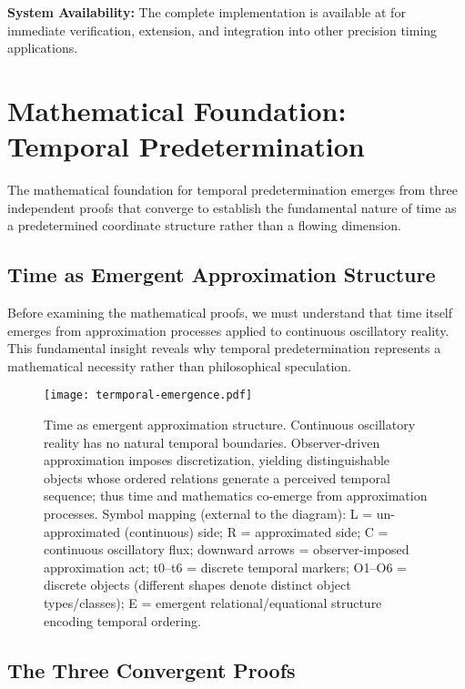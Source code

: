 \documentclass[12pt,a4paper]{article}
\begin{document}
\textbf{System Availability:} The complete implementation is available at \cite{stella-lorraine-implementation} for immediate verification, extension, and integration into other precision timing applications.

\section{Mathematical Foundation: Temporal Predetermination}

The mathematical foundation for temporal predetermination emerges from three independent proofs that converge to establish the fundamental nature of time as a predetermined coordinate structure rather than a flowing dimension.

\subsection{Time as Emergent Approximation Structure}

Before examining the mathematical proofs, we must understand that time itself emerges from approximation processes applied to continuous oscillatory reality. This fundamental insight reveals why temporal predetermination represents a mathematical necessity rather than philosophical speculation.

\begin{figure}[h]
\centering
\texttt{[image: termporal-emergence.pdf]}
\caption{Time as emergent approximation structure. Continuous oscillatory reality has no natural temporal boundaries. Observer-driven approximation imposes discretization, yielding distinguishable objects whose ordered relations generate a perceived temporal sequence; thus time and mathematics co-emerge from approximation processes. Symbol mapping (external to the diagram): L = un-approximated (continuous) side; R = approximated side; C = continuous oscillatory flux; downward arrows = observer-imposed approximation act; t0–t6 = discrete temporal markers; O1–O6 = discrete objects (different shapes denote distinct object types/classes); E = emergent relational/equational structure encoding temporal ordering.}
\label{fig:temporal-emergence}
\end{figure}


\subsection{The Three Convergent Proofs}
\end{document}
